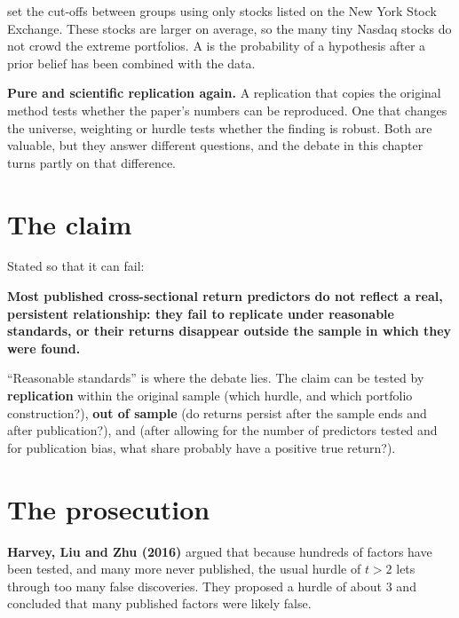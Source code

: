  set the cut-offs between groups using only stocks listed on the New York Stock Exchange. These stocks are larger on average, so the many tiny Nasdaq stocks do not crowd the extreme portfolios. A  is the probability of a hypothesis after a prior belief has been combined with the data.

\textbf{Pure and scientific replication again.} A replication that copies the original method tests whether the paper's numbers can be reproduced. One that changes the universe, weighting or hurdle tests whether the finding is robust. Both are valuable, but they answer different questions, and the debate in this chapter turns partly on that difference.

\section{The claim}
\label{sec:19-claim}

Stated so that it can fail:

\begin{callout}
\textbf{Most published cross-sectional return predictors do not reflect a real, persistent relationship: they fail to replicate under reasonable standards, or their returns disappear outside the sample in which they were found.}
\end{callout}

``Reasonable standards'' is where the debate lies. The claim can be tested by \textbf{replication} within the original sample (which hurdle, and which portfolio construction?), \textbf{out of sample} (do returns persist after the sample ends and after publication?), and  (after allowing for the number of predictors tested and for publication bias, what share probably have a positive true return?).

\section{The prosecution}
\label{sec:19-prosecution}

\textbf{Harvey, Liu and Zhu (2016)} argued that because hundreds of factors have been tested, and many more never published, the usual hurdle of $t > 2$ lets through too many false discoveries. They proposed a hurdle of about 3 and concluded that many published factors were likely false.

